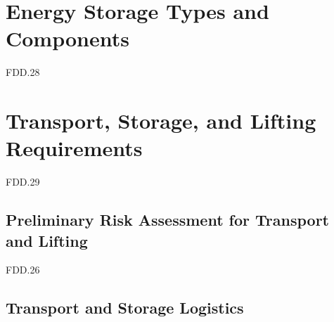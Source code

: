 \section{Energy Storage Types and Components}
FDD.28

\section{Transport, Storage, and Lifting Requirements}
FDD.29 
\subsection{Preliminary Risk Assessment for Transport and Lifting}
FDD.26 
\subsection{Transport and Storage Logistics}

\newpage
{}
 {
\newpage
}
